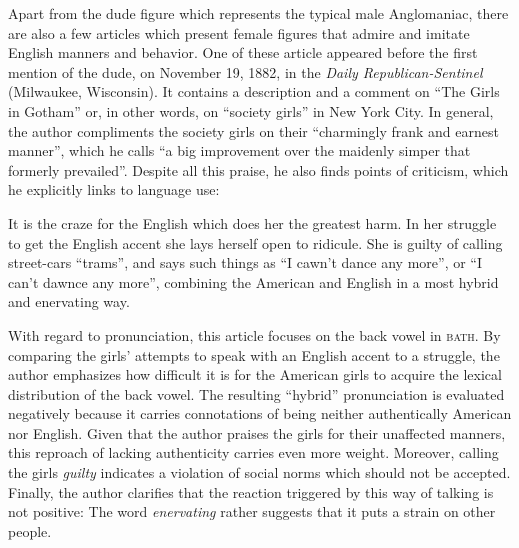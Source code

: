 Apart from the dude figure which represents the typical male Anglomaniac, there are also a few articles which present female figures that admire and imitate English manners and behavior. One of these article appeared before the first mention of the dude, on November 19, 1882, in the \emph{Daily Republican-Sentinel} (Milwaukee, Wisconsin). It contains a description and a comment on “The Girls in Gotham” or, in other words, on “society girls” in New York City. In general, the author compliments the society girls on their “charmingly frank and earnest manner”, which he calls “a big improvement over the maidenly simper that formerly prevailed”. Despite all this praise, he also finds points of criticism, which he explicitly links to language use:

\begin{ipquote}
It is the craze for the English which do{\kern0pt}es her the greatest harm. In her struggle to get the English accent she lays herself open to ridicule. She is guilty of calling street-cars “trams”, and says such things as “I cawn’t dance any more”, or “I can’t dawnce any more”, combining the American and English in a most hybrid and enervating way.
\end{ipquote}


With regard to pronunciation, this article focuses on the back vowel in \textsc{bath}. By comparing the girls’ attempts to speak with an English accent to a struggle, the author emphasizes how difficult it is for the American girls to acquire the lexical distribution of the back vowel. The resulting “hybrid” pronunciation is evaluated negatively because it carries connotations of being neither authentically American nor English. Given that the author praises the girls for their unaffected manners, this reproach of lacking authenticity carries even more weight. Moreover, calling the girls \emph{guilty} indicates a violation of social norms which should not be accepted. Finally, the author clarifies that the reaction triggered by this way of talking is not positive: The word \emph{enervating} rather suggests that it puts a strain on other people.


